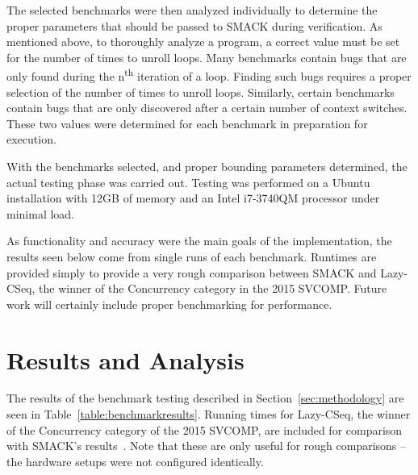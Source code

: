 The selected benchmarks were then analyzed individually to determine
the proper parameters that should be passed to SMACK during
verification.  As mentioned above, to thoroughly analyze a program, a
correct value must be set for the number of times to unroll loops.
Many benchmarks contain bugs that are only found during the
n\textsuperscript{th} iteration of a loop.  Finding such bugs requires a
proper selection of the number of times to unroll loops.  Similarly,
certain benchmarks contain bugs that are only discovered after a
certain number of context switches.  These two values were determined
for each benchmark in preparation for execution.

With the benchmarks selected, and proper bounding parameters
determined, the actual testing phase was carried out.  Testing was
performed on a Ubuntu installation with 12GB of memory and an Intel
i7-3740QM processor under minimal load.

As functionality and accuracy were the main goals of the
implementation, the results seen below come from single runs of each
benchmark.  Runtimes are provided simply to provide a very rough
comparison between SMACK and Lazy-CSeq, the winner of the Concurrency
category in the 2015 SVCOMP.  Future work will certainly include
proper benchmarking for performance.

\section{Results and Analysis}
The results of the benchmark testing described in
Section~\ref{sec:methodology} are seen in
Table~\ref{table:benchmarkresults}.  Running times for Lazy-CSeq, the winner 
of the Concurrency category of the 2015 SVCOMP, are included for
comparison with SMACK's results~\cite{TACAS15}.  Note that these are
only useful for rough comparisons -- the hardware setups were not
configured identically.

\newcommand{\specialcell}[3][c]{%
  \begin{tabular}[#1]{@{}#2@{}}#3\end{tabular}}

